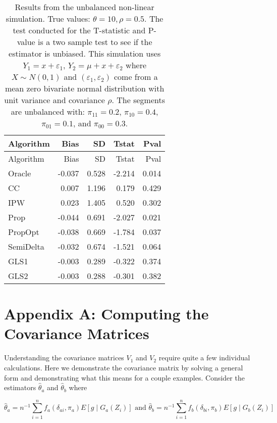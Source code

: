 \documentclass[
  letterpaper,
  DIV=11,
  numbers=noendperiod]{scrartcl}
\begin{document}
\begin{longtable}[]{@{}lrrrr@{}}
\caption{Results from the unbalanced non-linear simulation. True values:
\(\theta = 10, \rho = 0.5\). The test conducted for the T-statistic and
P-value is a two sample test to see if the estimator is unbiased. This
simulation uses \(Y_1 = x + \varepsilon_1\),
\(Y_2 = \mu + x + \varepsilon_2\) where \(X \sim N(0, 1)\) and
\((\varepsilon_1, \varepsilon_2)\) come from a mean zero bivariate
normal distribution with unit variance and covariance \(\rho\). The
segments are unbalanced with: \(\pi_{11} = 0.2\), \(\pi_{10} = 0.4\),
\(\pi_{01} = 0.1\), and \(\pi_{00} = 0.3\). }\tabularnewline
\toprule\noalign{}
Algorithm & Bias & SD & Tstat & Pval \\
\midrule\noalign{}
\endfirsthead
\toprule\noalign{}
Algorithm & Bias & SD & Tstat & Pval \\
\midrule\noalign{}
\endhead
\bottomrule\noalign{}
\endlastfoot
Oracle & -0.037 & 0.528 & -2.214 & 0.014 \\
CC & 0.007 & 1.196 & 0.179 & 0.429 \\
IPW & 0.023 & 1.405 & 0.520 & 0.302 \\
Prop & -0.044 & 0.691 & -2.027 & 0.021 \\
PropOpt & -0.038 & 0.669 & -1.784 & 0.037 \\
SemiDelta & -0.032 & 0.674 & -1.521 & 0.064 \\
GLS1 & -0.003 & 0.289 & -0.322 & 0.374 \\
GLS2 & -0.003 & 0.288 & -0.301 & 0.382 \\
\end{longtable}

\hypertarget{appendix-a-computing-the-covariance-matrices}{%
\section{Appendix A: Computing the Covariance
Matrices}\label{appendix-a-computing-the-covariance-matrices}}

Understanding the covariance matrices \(V_1\) and \(V_2\) require quite
a few individual calculations. Here we demonstrate the covariance matrix
by solving a general form and demonstrating what this means for a couple
examples. Consider the estimators \(\hat \theta_a\) and
\(\hat \theta_b\) where

\[
\hat \theta_a = n^{-1} \sum_{i = 1}^n f_a(\delta_{ai}, \pi_a) E[g \mid G_a(Z_i)] 
\text{ and }
\hat \theta_b = n^{-1} \sum_{i = 1}^n f_b(\delta_{bi}, \pi_b) E[g \mid G_b(Z_i)] 
\]
\end{document}
